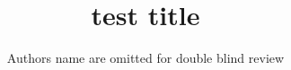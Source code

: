 \documentclass[conference]{style/IEEEtran}
\begin{document}
\title{test title}
\author{
Authors name are omitted for double blind review  
}

\maketitle







\end{document}
